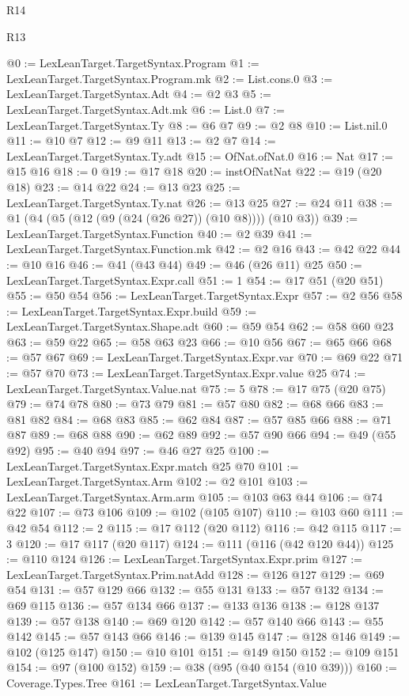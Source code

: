 \begin{lexlean}{R14}
\begin{lexlean}{R13}
\begin{coremodule}
{{{{{{{{{{@0 := LexLeanTarget.TargetSyntax.Program
@1 := LexLeanTarget.TargetSyntax.Program.mk
@2 := List.cons.{0}
@3 := LexLeanTarget.TargetSyntax.Adt
@4 := @2 @3
@5 := LexLeanTarget.TargetSyntax.Adt.mk
@6 := List.{0}
@7 := LexLeanTarget.TargetSyntax.Ty
@8 := @6 @7
@9 := @2 @8
@10 := List.nil.{0}
@11 := @10 @7
@12 := @9 @11
@13 := @2 @7
@14 := LexLeanTarget.TargetSyntax.Ty.adt
@15 := OfNat.ofNat.{0}
@16 := Nat
@17 := @15 @16
@18 := 0
@19 := @17 @18
@20 := instOfNatNat
@22 := @19 (@20 @18)
@23 := @14 @22
@24 := @13 @23
@25 := LexLeanTarget.TargetSyntax.Ty.nat
@26 := @13 @25
@27 := @24 @11
@38 := @1 (@4 (@5 (@12 (@9 (@24 (@26 @27)) (@10 @8)))) (@10 @3))
@39 := LexLeanTarget.TargetSyntax.Function
@40 := @2 @39
@41 := LexLeanTarget.TargetSyntax.Function.mk
@42 := @2 @16
@43 := @42 @22
@44 := @10 @16
@46 := @41 (@43 @44)
@49 := @46 (@26 @11) @25
@50 := LexLeanTarget.TargetSyntax.Expr.call
@51 := 1
@54 := @17 @51 (@20 @51)
@55 := @50 @54
@56 := LexLeanTarget.TargetSyntax.Expr
@57 := @2 @56
@58 := LexLeanTarget.TargetSyntax.Expr.build
@59 := LexLeanTarget.TargetSyntax.Shape.adt
@60 := @59 @54
@62 := @58 @60 @23
@63 := @59 @22
@65 := @58 @63 @23
@66 := @10 @56
@67 := @65 @66
@68 := @57 @67
@69 := LexLeanTarget.TargetSyntax.Expr.var
@70 := @69 @22
@71 := @57 @70
@73 := LexLeanTarget.TargetSyntax.Expr.value @25
@74 := LexLeanTarget.TargetSyntax.Value.nat
@75 := 5
@78 := @17 @75 (@20 @75)
@79 := @74 @78
@80 := @73 @79
@81 := @57 @80
@82 := @68 @66
@83 := @81 @82
@84 := @68 @83
@85 := @62 @84
@87 := @57 @85 @66
@88 := @71 @87
@89 := @68 @88
@90 := @62 @89
@92 := @57 @90 @66
@94 := @49 (@55 @92)
@95 := @40 @94
@97 := @46 @27 @25
@100 := LexLeanTarget.TargetSyntax.Expr.match @25 @70
@101 := LexLeanTarget.TargetSyntax.Arm
@102 := @2 @101
@103 := LexLeanTarget.TargetSyntax.Arm.arm
@105 := @103 @63 @44
@106 := @74 @22
@107 := @73 @106
@109 := @102 (@105 @107)
@110 := @103 @60
@111 := @42 @54
@112 := 2
@115 := @17 @112 (@20 @112)
@116 := @42 @115
@117 := 3
@120 := @17 @117 (@20 @117)
@124 := @111 (@116 (@42 @120 @44))
@125 := @110 @124
@126 := LexLeanTarget.TargetSyntax.Expr.prim
@127 := LexLeanTarget.TargetSyntax.Prim.natAdd
@128 := @126 @127
@129 := @69 @54
@131 := @57 @129 @66
@132 := @55 @131
@133 := @57 @132
@134 := @69 @115
@136 := @57 @134 @66
@137 := @133 @136
@138 := @128 @137
@139 := @57 @138
@140 := @69 @120
@142 := @57 @140 @66
@143 := @55 @142
@145 := @57 @143 @66
@146 := @139 @145
@147 := @128 @146
@149 := @102 (@125 @147)
@150 := @10 @101
@151 := @149 @150
@152 := @109 @151
@154 := @97 (@100 @152)
@159 := @38 (@95 (@40 @154 (@10 @39)))
@160 := Coverage.Types.Tree
@161 := LexLeanTarget.TargetSyntax.Value
}}}}}}}}}}
\end{coremodule}
\end{lexlean}
\end{lexlean}
